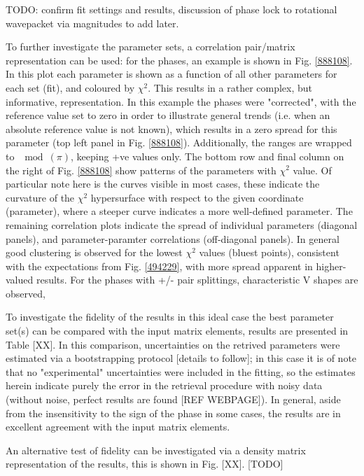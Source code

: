 TODO: confirm fit settings and results, discussion of phase lock to rotational wavepacket via magnitudes to add later.

To further investigate the parameter sets, a correlation pair/matrix representation can be used: for the phases, an example is shown in Fig. \ref{888108}. In this plot each parameter is shown as a function of all other parameters for each set (fit), and coloured by $\chi^2$. This results in a rather complex, but informative, representation. In this example the phases were "corrected", with the reference value set to zero in order to illustrate general trends (i.e. when an absolute reference value is not known), which results in a zero spread for this parameter (top left panel in Fig. \ref{888108}). Additionally, the ranges are wrapped to $\mod(\pi)$, keeping +ve values only. The bottom row and final column on the right of Fig. \ref{888108} show patterns of the parameters with $\chi^2$ value. Of particular note here is the curves visible in most cases, these indicate the curvature of the $\chi^2$ hypersurface with respect to the given coordinate (parameter), where a steeper curve indicates a more well-defined parameter. The remaining correlation plots indicate the spread of individual parameters (diagonal panels), and parameter-paramter correlations (off-diagonal panels). In general good clustering is observed for the lowest $\chi^2$ values (bluest points), consistent with the expectations from Fig. \ref{494229}, with more spread apparent in higher-valued results. For the phases with +/- pair splittings, characteristic V shapes are observed, 

To investigate the fidelity of the results in this ideal case the best parameter set(s) can be compared with the input matrix elements, results are presented in Table [XX]. In this comparison, uncertainties on the retrived parameters were estimated via a bootstrapping protocol [details to follow]; in this case it is of note that no "experimental" uncertainties were included in the fitting, so the estimates herein indicate purely the error in the retrieval procedure with noisy data (without noise, perfect results are found [REF WEBPAGE]). In general, aside from the insensitivity to the sign of the phase in some cases, the results are in excellent agreement with the input matrix elements.

An alternative test of fidelity can be investigated via a density matrix representation of the results, this is shown in Fig. [XX]. [TODO]






